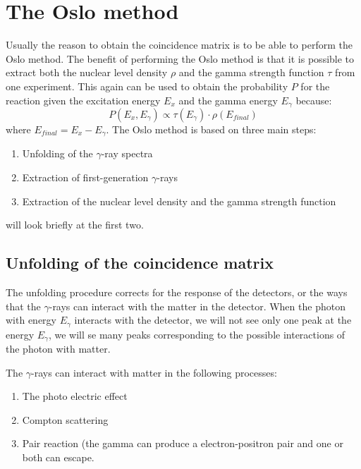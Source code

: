 \documentclass[11pt,a4wide]{article}
\begin{document}

\section{The Oslo method}
Usually the reason to obtain the coincidence matrix is to be able to perform the Oslo method. The benefit of performing the Oslo method is that it is possible to extract both the nuclear level density $\rho$ and the gamma strength function $\tau$ from one experiment. This again can be used to obtain the probability $P$ for the reaction given the excitation energy $E_x$ and the gamma energy $E_\gamma$ because:
\[
P(E_x, E_\gamma) \propto \tau(E_\gamma)\cdot \rho(E_{final})
\]
where $E_{final} = E_x - E_\gamma$. The Oslo method is based on three main steps:
\begin{enumerate}
\item Unfolding of the $\gamma$-ray spectra
\item Extraction of first-generation $\gamma$-rays
\item Extraction of the nuclear level density and the gamma strength function
\end{enumerate}
will look briefly at the first two. 

\subsection{Unfolding of the coincidence matrix}

The unfolding procedure corrects for the response of the detectors, or the ways that the $\gamma$-rays can interact with the matter in the detector. When the photon with energy $E_\gamma$ interacts with the detector, we will not see only one peak at the energy $E_\gamma$, we will se many peaks corresponding to the possible interactions of the photon with matter. 

The $\gamma$-rays can interact with matter in the following processes:
\begin{enumerate}
\item The photo electric effect
\item Compton scattering
\item Pair reaction (the gamma can produce a electron-positron pair and one or both can escape. 
\end{enumerate}
\end{document}
